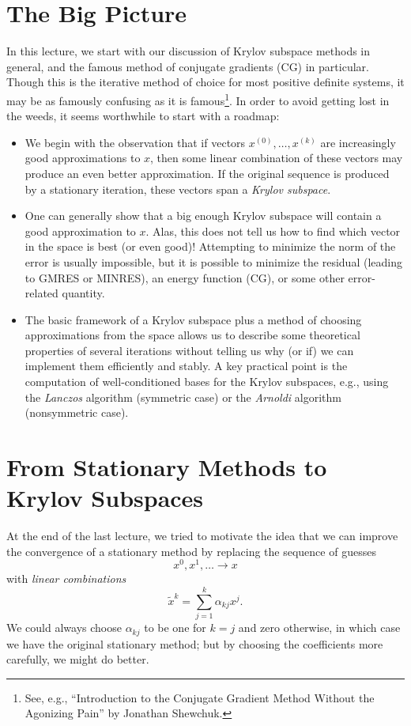\documentclass[12pt, leqno]{article}
\begin{document}

\section*{The Big Picture}

In this lecture, we start with our discussion of Krylov subspace
methods in general, and the famous method of conjugate gradients (CG)
in particular.  Though this is the iterative method of choice for most
positive definite systems, it may be as famously confusing as it is
famous\footnote{%
  See, e.g., ``Introduction to the Conjugate Gradient
  Method Without the Agonizing Pain'' by Jonathan Shewchuk.}.
In order to avoid getting lost in the weeds, it seems worthwhile to
start with a roadmap:
\begin{itemize}
\item
  We begin with the observation that if vectors $x^{(0)}, \ldots,
  x^{(k)}$ are increasingly good approximations to $x$, then some
  linear combination of these vectors may produce an even better
  approximation.  If the original sequence is produced by a stationary
  iteration, these vectors span a {\em Krylov subspace}.
\item
  One can generally show that a big enough Krylov subspace will
  contain a good approximation to $x$.  Alas, this does not tell us
  how to find which vector in the space is best (or even good)!
  Attempting to minimize the norm of the error is usually impossible,
  but it is possible to minimize the residual (leading to GMRES or
  MINRES), an energy function (CG), or some other error-related
  quantity.
\item
  The basic framework of a Krylov subspace plus a method of choosing
  approximations from the space allows us to describe some theoretical
  properties of several iterations without telling us why (or if) we
  can implement them efficiently and stably.  A key practical point is
  the computation of well-conditioned bases for the Krylov subspaces,
  e.g., using the {\em Lanczos} algorithm (symmetric case) or the
  {\em Arnoldi} algorithm (nonsymmetric case).
\end{itemize}

\section*{From Stationary Methods to Krylov Subspaces}

At the end of the last lecture, we tried to motivate the idea that
we can improve the convergence of a stationary method by replacing
the sequence of guesses
\[
  x^0, x^1, \ldots \rightarrow x
\]
with {\em linear combinations}
\[
  \tilde{x}^k = \sum_{j=1}^k \alpha_{kj} x^j.
\]
We could always choose $\alpha_{kj}$ to be one for $k = j$ and zero
otherwise, in which case we have the original stationary method;
but by choosing the coefficients more carefully, we might do better.
\end{document}
